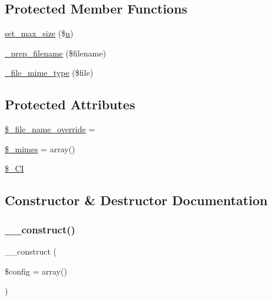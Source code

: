\subsection*{Protected Member Functions}
\begin{DoxyCompactItemize}
\item 
\mbox{\hyperlink{class_c_i___upload_ac6e7445ece6780c730e910d978dde95e}{set\+\_\+max\+\_\+size}} (\$\mbox{\hyperlink{cli_2error__php_8php_a2e6b16bbc42094e4c51ade3c10afdcf1}{n}})
\item 
\mbox{\hyperlink{class_c_i___upload_a00936ce870d818794909bf16dc2ff70b}{\+\_\+prep\+\_\+filename}} (\$filename)
\item 
\mbox{\hyperlink{class_c_i___upload_a8ac4511eca70b271965b7f8ef00faf66}{\+\_\+file\+\_\+mime\+\_\+type}} (\$file)
\end{DoxyCompactItemize}
\subsection*{Protected Attributes}
\begin{DoxyCompactItemize}
\item 
\mbox{\hyperlink{class_c_i___upload_a9f09c7cb693d391de63f9c8e91f159e1}{\$\+\_\+file\+\_\+name\+\_\+override}} = \textquotesingle{}\textquotesingle{}
\item 
\mbox{\hyperlink{class_c_i___upload_a7cc0f09266cdbeff9d73c31b88d5af87}{\$\+\_\+mimes}} = array()
\item 
\mbox{\hyperlink{class_c_i___upload_a9b6039aa2ad20924954fde50a2db8d26}{\$\+\_\+\+CI}}
\end{DoxyCompactItemize}


\subsection{Constructor \& Destructor Documentation}
\mbox{\label{class_c_i___upload_af7f9493844d2d66e924e3c1df51ce616}} 
\subsubsection{\texorpdfstring{\+\_\+\+\_\+construct()}{\_\_construct()}}
{\footnotesize\ttfamily \+\_\+\+\_\+construct (\begin{DoxyParamCaption}\item[{}]{\$config = {\ttfamily array()} }\end{DoxyParamCaption})}

